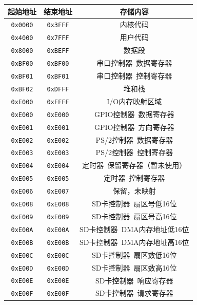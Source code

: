 \documentclass[11pt,utf8]{report}
\begin{document}
\begin{table}[h]
\centering
\small
\begin{tabular}{c|c|c}
\toprule[1.2pt]
\textbf{起始地址} & \textbf{结束地址} & \textbf{存储内容} \\
\midrule[1.2pt]
\texttt{0x0000} & \texttt{0x3FFF} & 内核代码 \\ \hline
\texttt{0x4000} & \texttt{0x7FFF} & 用户代码 \\ \hline
\texttt{0x8000} & \texttt{0xBEFF} & 数据段 \\ \hline
\texttt{0xBF00} & \texttt{0xBF00} & 串口控制器~数据寄存器 \\ \hline
\texttt{0xBF01} & \texttt{0xBF01} & 串口控制器~控制寄存器 \\ \hline
\texttt{0xBF02} & \texttt{0xDFFF} & 堆和栈 \\ \hline
\texttt{0xE000} & \texttt{0xFFFF} & I/O内存映射区域 \\ \hline
\texttt{0xE000} & \texttt{0xE000} & GPIO控制器~数据寄存器 \\ \hline
\texttt{0xE001} & \texttt{0xE001} & GPIO控制器~方向寄存器 \\ \hline
\texttt{0xE002} & \texttt{0xE002} & PS/2控制器~数据寄存器 \\ \hline
\texttt{0xE003} & \texttt{0xE003} & PS/2控制器~控制寄存器 \\ \hline
\texttt{0xE004} & \texttt{0xE004} & 定时器~保留寄存器（暂未使用） \\ \hline
\texttt{0xE005} & \texttt{0xE005} & 定时器~控制寄存器 \\ \hline
\texttt{0xE006} & \texttt{0xE007} & 保留，未映射 \\ \hline
\texttt{0xE008} & \texttt{0xE008} & SD卡控制器~扇区号低16位 \\ \hline
\texttt{0xE009} & \texttt{0xE009} & SD卡控制器~扇区号高16位 \\ \hline
\texttt{0xE00A} & \texttt{0xE00A} & SD卡控制器~DMA内存地址低16位 \\ \hline
\texttt{0xE00B} & \texttt{0xE00B} & SD卡控制器~DMA内存地址高16位 \\ \hline
\texttt{0xE00C} & \texttt{0xE00C} & SD卡控制器~扇区数低16位 \\ \hline
\texttt{0xE00D} & \texttt{0xE00D} & SD卡控制器~扇区数高16位 \\ \hline
\texttt{0xE00E} & \texttt{0xE00E} & SD卡控制器~响应寄存器 \\ \hline
\texttt{0xE00F} & \texttt{0xE00F} & SD卡控制器~请求寄存器 \\ \hline

\end{tabular}
\end{table}
\end{document}

